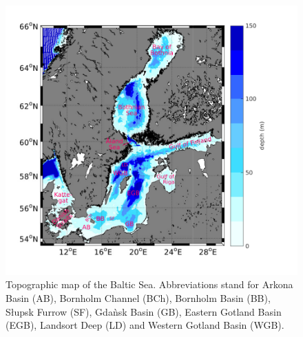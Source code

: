 \begin{figure}[ht]
 \flushleft
 \includegraphics[width=17cm]{bilder/baltic.pdf}
 \caption{Topographic map of the Baltic Sea. Abbreviations stand for Arkona 
Basin (AB), Bornholm Channel (BCh), Bornholm Basin (BB), S\l upsk Furrow (SF), 
Gda\`{n}sk Basin (GB), Eastern Gotland Basin (EGB), Landsort Deep (LD) and 
Western Gotland Basin (WGB).}\label{balticmap}
\end{figure}

